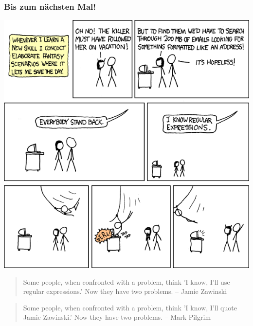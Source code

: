 \begin{frame}
\frametitle{Bis zum nächsten Mal!}
\vspace{-0.5cm}
\begin{center}\includegraphics[height=0.8\textheight]{images/regular_expressions.png}\end{center}

\scriptsize{\begin{quote}
Some people, when confronted with a problem, think 'I know, I'll use regular expressions.' Now they have two problems. -- Jamie Zawinski
\end{quote}}

\tiny{\begin{quote}
Some people, when confronted with a problem, think 'I know, I’ll quote Jamie Zawinski.' Now they have two problems. -- Mark Pilgrim
\end{quote}}
\end{frame}


